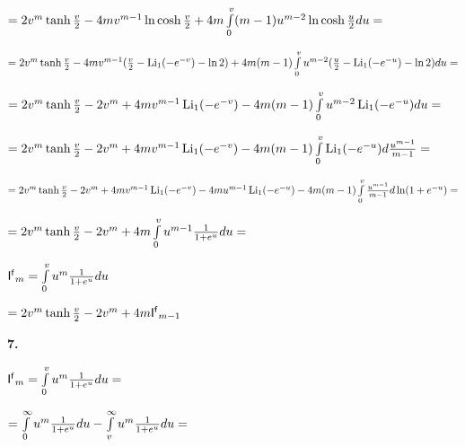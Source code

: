 \documentclass[a4paper,12pt]{article}
\begin{document}
\begin{center}
    $= 2v^m \operatorname{tanh}{v\over{2}} - 4 m v^{m - 1} \ln{\operatorname{cosh}{v\over{2}}} + 4m\int\limits_0^v (m - 1) u^{m - 2} \ln{\operatorname{cosh}{u\over{2}}} d u  =$
\end{center}

\begin{center}
    $= 2v^m \operatorname{tanh}{v\over{2}} - 4 m v^{m - 1}({v\over{2}} - \operatorname{Li_1}(-e^{-v}) - \ln{2}) + 4m(m - 1) \int\limits_0^v u^{m - 2} ({u\over{2}} - \operatorname{Li_1}(-e^{-u}) - \ln{2}) d u  =$
\end{center}

\begin{center}
    $= 2v^m \operatorname{tanh}{v\over{2}} - 2v^m + 4m v^{m - 1}\operatorname{Li_1}(-e^{-v}) - 4m(m - 1) \int\limits_0^v u^{m - 2} \operatorname{Li_1}(-e^{-u}) d u  =$
\end{center}

\begin{center}
    $= 2v^m \operatorname{tanh}{v\over{2}} - 2v^m + 4m v^{m - 1}\operatorname{Li_1}(-e^{-v}) - 4m(m - 1) \int\limits_0^v \operatorname{Li_1}(-e^{-u}) d {u^{m - 1}\over{m - 1}}  =$
\end{center}

\begin{center}
    $= 2v^m \operatorname{tanh}{v\over{2}} - 2v^m + 4m v^{m - 1}\operatorname{Li_1}(-e^{-v}) - 4m u^{m - 1}\operatorname{Li_1}(-e^{-u}) - 4m(m - 1)\int\limits_0^v {u^{m - 1}\over{m - 1}} d\ln(1 + e^{-u}) =$
\end{center}

\begin{center}
    $= 2v^m \operatorname{tanh}{v\over{2}} - 2v^m + 4m\int\limits_0^v u^{m - 1} {1\over{1 + e^{u}}}d u =$
\end{center}

 $\mathsf{I^f}_m = \int\limits_0^v u^{m} {1\over{1 + e^{u}}}d u$

\begin{center}
    $= 2v^m \operatorname{tanh}{v\over{2}} - 2v^m + 4m \mathsf{I^f}_{m - 1}$
\end{center}

\noindent\textbf{7.}

\begin{center}
    $\mathsf{I^f}_m = \int\limits_0^v u^{m} {1\over{1 + e^{u}}}d u =$
\end{center}

\begin{center}
    $= \int\limits_0^{\infty} u^{m} {1\over{1 + e^{u}}}d u - \int\limits_v^{\infty} u^{m} {1\over{1 + e^{u}}}d u =$
\end{center}
\end{document}
